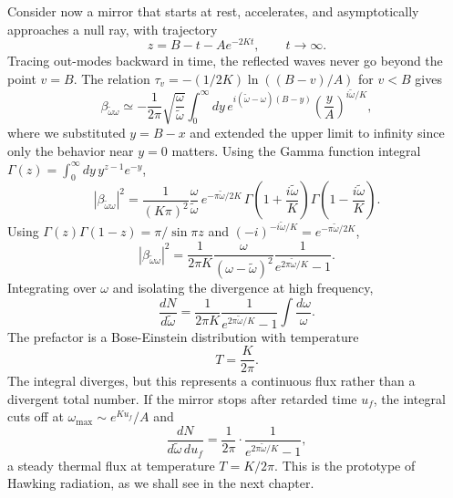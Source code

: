 Consider now a mirror that starts at rest, accelerates, and
asymptotically approaches a null ray, with trajectory
\begin{equation}
	z = B - t - Ae^{-2Kt}, \qquad t\to\infty.
\end{equation}
Tracing out-modes backward in time, the reflected waves never go beyond
the point $v = B$. The relation $\tau_v = -(1/2K)\ln((B-v)/A)$ for
$v < B$ gives
\begin{equation}
	\beta_{\tilde\omega\omega}
	\simeq -\frac{1}{2\pi}\sqrt{\frac{\omega}{\tilde\omega}}
	\int_0^\infty dy\,
	e^{i(\tilde\omega-\omega)(B-y)}
	\left(\frac{y}{A}\right)^{i\tilde\omega/K},
\end{equation}
where we substituted $y = B - x$ and extended the upper limit to
infinity since only the behavior near $y = 0$ matters. Using the
Gamma function integral $\Gamma(z) = \int_0^\infty dy\,y^{z-1}e^{-y}$,
\begin{equation}
	|\beta_{\tilde\omega\omega}|^2
	= \frac{1}{(K\pi)^2}\frac{\omega}{\tilde\omega}
	\,e^{-\pi\tilde\omega/2K}
	\,\Gamma\!\left(1+\frac{i\tilde\omega}{K}\right)
	\Gamma\!\left(1-\frac{i\tilde\omega}{K}\right).
\end{equation}
Using $\Gamma(z)\Gamma(1-z) = \pi/\sin\pi z$ and
$(-i)^{-i\tilde\omega/K} = e^{-\pi\tilde\omega/2K}$,
\begin{equation}
	|\beta_{\tilde\omega\omega}|^2
	= \frac{1}{2\pi K}\frac{\omega}{(\omega-\tilde\omega)^2}
	\frac{1}{e^{2\pi\tilde\omega/K}-1}.
\end{equation}
Integrating over $\omega$ and isolating the divergence at high
frequency,
\begin{equation}
	\frac{dN}{d\tilde\omega}
	= \frac{1}{2\pi K}\frac{1}{e^{2\pi\tilde\omega/K}-1}
	\int\frac{d\omega}{\omega}.
\end{equation}
The prefactor is a Bose-Einstein distribution with temperature
\begin{equation}
	T = \frac{K}{2\pi}.
\end{equation}
The integral diverges, but this represents a continuous flux rather
than a divergent total number. If the mirror stops after retarded time
$u_f$, the integral cuts off at $\omega_{\max}\sim e^{Ku_f}/A$ and
\begin{equation}
	\frac{dN}{d\tilde\omega\,du_f}
	= \frac{1}{2\pi}\cdot\frac{1}{e^{2\pi\tilde\omega/K}-1},
\end{equation}
a steady thermal flux at temperature $T = K/2\pi$. This is the
prototype of Hawking radiation, as we shall see in the next chapter.


